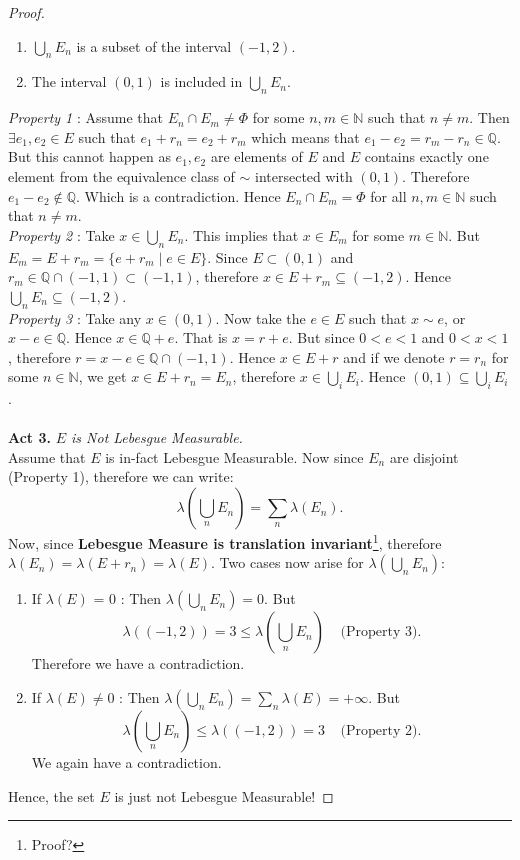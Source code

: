 \documentclass{article}
\theoremstyle{definition}
\theoremstyle{remark}
\theoremstyle{definition}
\theoremstyle{definition}
\theoremstyle{definition}
\newcommand{\intrs}{\cap}
\newcommand{\bunion}{\bigcup}
\newcommand{\where}{\;\vert\;}
\newcommand{\N}{\mathbb{N}}
\newcommand{\Q}{\mathbb{Q}}
\newcommand{\lm}[1]{\lambda\left (#1\right )}
\begin{document}
\begin{proof}
\begin{enumerate}
		\item {{$ \bunion_n E_n $ is a subset of the interval $ (-1,2) $.}}
		\item {{The interval $ (0,1) $ is included in $ \bunion_n E_n $.}}
	\end{enumerate}
	\emph{Property 1} : Assume that $ E_n \intrs E_m \neq \Phi$ for some $ n,m\in \N $ such that $ n\neq m $. Then $ \exists e_1,e_2 \in E $ such that $ e_1 + r_{n} = e_2 + r_m $ which means that $ e_1 - e_2 = r_m - r_n \in \Q$. But this cannot happen as $ e_1, e_2 $ are elements of $ E $ and $ E $ contains exactly one element from the equivalence class of $ \sim $ intersected with $ (0,1) $. Therefore $ e_1-e_2 \notin \Q $. Which is a contradiction. Hence $ E_n \intrs E_m = \Phi$ for all $ n,m\in \N $ such that $ n\neq m $.\\
	\emph{Property 2} : Take $ x\in \bunion_n E_n $. This implies that $ x\in E_m $ for some $ m\in \N $. But $ E_m = E+r_m = \{e+r_m \where e\in E\} $. Since $ E\subset (0,1) $ and $ r_m \in \Q\intrs(-1,1) \subset (-1,1) $, therefore $x\in  E+r_m \subseteq (-1,2) $. Hence $ \bunion_n E_n \subseteq (-1,2) $.\\
	\emph{Property 3} : Take any $ x\in (0,1) $. Now take the $ e\in E $ such that $ x\sim e $, or $ x-e \in \Q $. Hence $ x \in \Q + e $. That is $ x= r + e $. But since $ 0<e<1 $ and $ 0<x<1 $, therefore $ r = x-e \in \Q \intrs (-1,1) $. Hence $ x \in E +r $ and if we denote $ r = r_n $ for some $ n\in \N $, we get $ x\in E+r_n = E_n $, therefore $ x\in \bunion_i E_i $. Hence $ (0,1)\subseteq \bunion_i E_i $.\\\\
	\textbf{Act 3.} \emph{$ E $ is Not Lebesgue Measurable.}  \\
	Assume that $ E $ is in-fact Lebesgue Measurable. Now since $ E_n $ are disjoint (Property 1), therefore we can write:
	\[\lm{\bunion_n E_n} = \sum_n \lm{E_n}.\]
	Now, since \textbf{Lebesgue Measure is translation invariant}\footnote{Proof?}, therefore $ \lm{E_n} = \lm{E + r_n} = \lm{E} $. Two cases now arise for $ \lm{\bunion_n E_n} $:
	\begin{enumerate}
		\item {If $ \lm{E} $ = 0 : Then $ \lm{\bunion_n E_n} = 0$. But
			\[\lm{(-1,2)} = 3 \le \lm{\bunion_n E_n}\;\;\;\;\text{(Property 3)}.\]
			Therefore we have a contradiction.}
		\item {If $ \lm{E} \neq 0 $ : Then $ \lm{\bunion_n E_n} = \sum_n \lm{E} = +\infty $. But
	\[\lm{\bunion_n E_n}\le \lm{(-1,2)}=3\;\;\;\;\text{(Property 2).}\]	
We again have a contradiction.	
}
	\end{enumerate}
Hence, the set $ E $ is just not Lebesgue Measurable!
\end{proof}
\hrulefill
\end{document}
